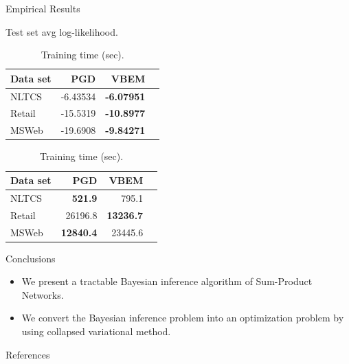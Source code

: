 \documentclass[final]{beamer}
\newlength{\onecolwid}
\newcommand{\cmuRed}[1]{\textcolor{CMURed}{#1}}
\begin{document}
\begin{frame}[t]
\begin{columns}[t]
\begin{column}{\onecolwid}
\begin{block}{Empirical Results}
\begin{table}
\begin{subtable}[b]{0.45\linewidth}
\centering
\caption{Test set avg log-likelihood.}
\begin{tabular}{|l||r|r|r|}\hline
\textbf{Data set} & PGD & VBEM \\\hline
NLTCS & -6.43534 & \textbf{-6.07951} \\
Retail & -15.5319 & \textbf{-10.8977}  \\
MSWeb & -19.6908 & \textbf{-9.84271} \\\hline
\end{tabular}
\end{subtable}%
\begin{subtable}[b]{0.45\linewidth}
\centering
\caption{Training time (sec).}
\begin{tabular}{|l||r|r|r|}\hline
\textbf{Data set} & PGD & VBEM \\\hline
NLTCS & \textbf{521.9}  & 795.1 \\
Retail & 26196.8 & \textbf{13236.7} \\
MSWeb & \textbf{12840.4} & 23445.6\\\hline
\end{tabular}
\end{subtable}
\end{table}
      \end{block}

      \begin{block}{Conclusions}
        \begin{itemize}
        \item 	We present a \cmuRed{tractable Bayesian inference algorithm} of Sum-Product Networks. 
        \item 	We convert the Bayesian inference problem into an optimization problem by using collapsed variational method. 
        \end{itemize}
      \end{block}

      \begin{block}{References}
        {\small
          
          
        }
      \end{block}

    \end{column} %

  \end{columns} %

\end{frame} %
\end{document}
